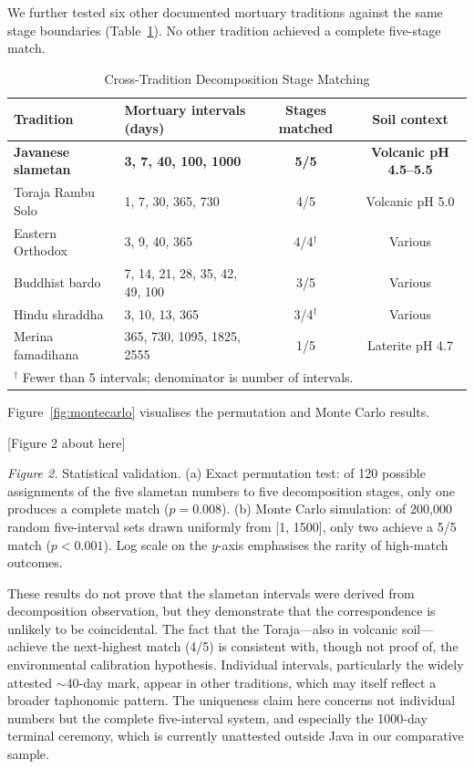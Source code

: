 \documentclass[12pt,a4paper]{article}
\begin{document}
We further tested six other documented mortuary traditions against the same stage boundaries (Table~\ref{tab:cross_tradition}). No other tradition achieved a complete five-stage match.

\begin{table}[H]
\centering
\caption{Cross-Tradition Decomposition Stage Matching}
\label{tab:cross_tradition}
\small
\begin{tabularx}{\textwidth}{@{}lXcc@{}}
\toprule
\textbf{Tradition} & \textbf{Mortuary intervals (days)} & \textbf{Stages matched} & \textbf{Soil context} \\
\midrule
\textbf{Javanese slametan} & \textbf{3, 7, 40, 100, 1000} & \textbf{5/5} & \textbf{Volcanic pH 4.5--5.5} \\
Toraja Rambu Solo & 1, 7, 30, 365, 730 & 4/5 & Volcanic pH 5.0 \\
Eastern Orthodox & 3, 9, 40, 365 & 4/4$^\dagger$ & Various \\
Buddhist bardo & 7, 14, 21, 28, 35, 42, 49, 100 & 3/5 & Various \\
Hindu shraddha & 3, 10, 13, 365 & 3/4$^\dagger$ & Various \\
Merina famadihana & 365, 730, 1095, 1825, 2555 & 1/5 & Laterite pH 4.7 \\
\bottomrule
\multicolumn{4}{l}{\footnotesize $^\dagger$ Fewer than 5 intervals; denominator is number of intervals.}
\end{tabularx}
\end{table}

Figure~\ref{fig:montecarlo} visualises the permutation and Monte Carlo results.

[Figure 2 about here]

\noindent\textit{Figure 2.} Statistical validation. (a) Exact permutation test: of 120 possible assignments of the five slametan numbers to five decomposition stages, only one produces a complete match ($p = 0.008$). (b) Monte Carlo simulation: of 200,000 random five-interval sets drawn uniformly from [1, 1500], only two achieve a 5/5 match ($p < 0.001$). Log scale on the $y$-axis emphasises the rarity of high-match outcomes.
\label{fig:montecarlo}

These results do not prove that the slametan intervals were derived from decomposition observation, but they demonstrate that the correspondence is unlikely to be coincidental. The fact that the Toraja---also in volcanic soil---achieve the next-highest match (4/5) is consistent with, though not proof of, the environmental calibration hypothesis. Individual intervals, particularly the widely attested $\sim$40-day mark, appear in other traditions, which may itself reflect a broader taphonomic pattern. The uniqueness claim here concerns not individual numbers but the complete five-interval system, and especially the 1000-day terminal ceremony, which is currently unattested outside Java in our comparative sample.
\end{document}

